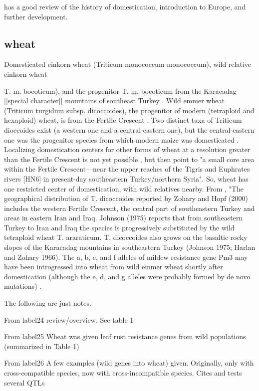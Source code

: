 \documentclass[11pt]{article}
\begin{document}
\cite{bitocchi2009introgression} has a good review of the history of domestication, introduction to Europe, and further development.


\subsection*{wheat}

Domesticated einkorn wheat (Triticum monococcum monococcum), wild relative einkorn wheat {T. m. boeoticum), and the progenitor T. m. boeoticum from the Karacadag [[special character]] mountains of southeast Turkey \cite{heun1997site}.
Wild emmer wheat (Triticum turgidum subsp. dicoccoides), the progenitor of modern (tetraploid and hexaploid) wheat, is from the Fertile Crescent \cite{lev2000cradle}.
Two distinct taxa of Triticum dioccoides exist (a western one and a central-eastern one), but the central-eastern one was the progenitor species from which modern maize was domesticated \cite{ozkan2005reconsideration}.
Localizing domestication centers for other forms of wheat at a resolution greater than the Fertile Crescent is not yet possible \cite{nesbitt1998wheat}, but then \cite{lev2000cradle} point to "a small core area within the Fertile Crescent—near the upper reaches of the Tigris and Euphrates rivers [HN6] in present-day southeastern Turkey/northern Syria".
So, wheat has one restricted center of domestication, with wild relatives nearby.  From \cite{ozkan2005reconsideration}, "The geographical distribution of T. dicoccoides reported by Zohary and Hopf (2000) includes the western Fertile Crescent, the central part of southeastern Turkey and areas in eastern Iran and Iraq. Johnson (1975) reports that from southeastern Turkey to Iran and Iraq the species is progressively substituted by the wild tetraploid wheat T. araraticum. T. dicoccoides also grows on the basaltic rocky slopes of the Karacadag mountains in southeastern Turkey (Johnson 1975; Harlan and Zohary 1966).
The a, b, c, and f alleles of mildew resistance gene Pm3 may have been introgressed into wheat from wild emmer wheat shortly after domestication (although the e, d, and g alleles were probably formed by de novo mutations) \cite{TPJ:TPJ2772}.

The following are just notes.

From {label24}
review/overview.  See table 1

From {label25}
Wheat was given leaf rust resistance genes from wild populations (summarized in Table 1)

From {label26}
A few examples (wild genes into wheat) given.  Originally, only with cross-compatible species, now with cross-incompatible species.
Cites and tests several QTLs

}
\end{document}
